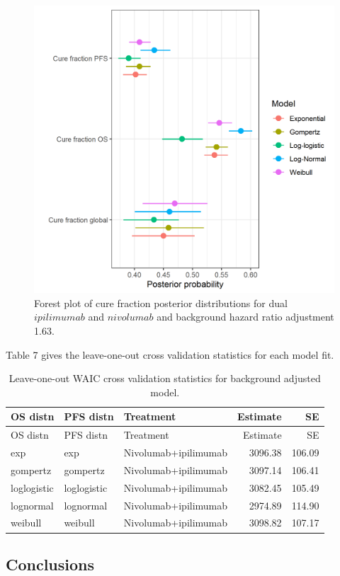 \documentclass[
]{article}
\begin{document}
\begin{figure}

{\centering \includegraphics[width=0.6\linewidth]{../plots/cf hier_bg_fixed_hr1.63_forest_plot} 

}

\caption{\label{fig:forest_global_163}Forest plot of cure fraction posterior distributions for dual $ipilimumab$ and $nivolumab$ and background hazard ratio adjustment 1.63.}\label{fig:unnamed-chunk-12}
\end{figure}

\newpage

Table 7 gives the leave-one-out cross validation statistics for each
model fit.

\begin{longtable}[]{@{}lllrr@{}}
\caption{Leave-one-out WAIC cross validation statistics for background
adjusted model.}\tabularnewline
\toprule
OS distn & PFS distn & Treatment & Estimate & SE \\
\midrule
\endfirsthead
\toprule
OS distn & PFS distn & Treatment & Estimate & SE \\
\midrule
\endhead
exp & exp & Nivolumab+ipilimumab & 3096.38 & 106.09 \\
gompertz & gompertz & Nivolumab+ipilimumab & 3097.14 & 106.41 \\
loglogistic & loglogistic & Nivolumab+ipilimumab & 3082.45 & 105.49 \\
lognormal & lognormal & Nivolumab+ipilimumab & 2974.89 & 114.90 \\
weibull & weibull & Nivolumab+ipilimumab & 3098.82 & 107.17 \\
\bottomrule
\end{longtable}

\hypertarget{conclusions}{%
\subsection{Conclusions}\label{conclusions}}
\end{document}
